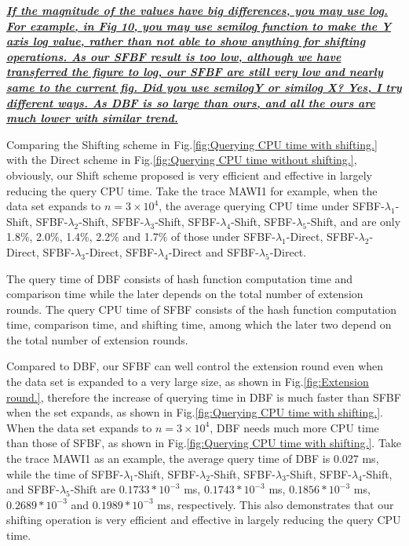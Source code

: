 \documentclass[10pt,journal,letterpaper]{IEEEtran}
\newcommand{\note}[1]{{\sffamily\itshape\bfseries\uline{#1}}}
\begin{document}
\note{If the magnitude of the values have big differences, you may use log. For example, in Fig 10, you may use semilog function to make the Y axis log value, rather than not able to show anything for shifting operations. As our SFBF result is too low, although we have transferred the figure to log, our SFBF are still very low and nearly same to the current fig. Did you use semilogY or similog X? Yes, I try different ways. As DBF is so large than ours, and all the ours are much lower with similar trend. }

 Comparing the Shifting scheme in Fig.\ref{fig:Querying CPU time with shifting.}  with the Direct scheme in Fig.\ref{fig:Querying CPU time without shifting.}, obviously, our Shift scheme proposed is very efficient and effective in largely reducing the query CPU time. Take the trace MAWI1 for example, when the data set expands to $n = 3 \times 10^4$, the average querying CPU time under SFBF-$\lambda_1$-Shift, SFBF-$\lambda_2$-Shift, SFBF-$\lambda_3$-Shift, SFBF-$\lambda_4$-Shift, SFBF-$\lambda_5$-Shift, and are only 1.8\%, 2.0\%, 1.4\%, 2.2\% and 1.7\% of those under SFBF-$\lambda_1$-Direct, SFBF-$\lambda_2$-Direct, SFBF-$\lambda_3$-Direct, SFBF-$\lambda_4$-Direct and SFBF-$\lambda_5$-Direct.

The query time of DBF consists of hash function computation time and comparison time while the later depends on the total number of extension rounds. The query CPU time of SFBF consists of the hash function computation time, comparison time, and shifting time, among which the later two depend on the total number of extension rounds.

 Compared to DBF, our SFBF can well control the extension round even when the data set is expanded to a very large size, as shown in Fig.\ref{fig:Extension round.}, therefore the increase of querying time in DBF is much faster than SFBF when the set expands, as shown in Fig.\ref{fig:Querying CPU time with shifting.}. When the data set expands to $n = 3 \times 10^4$, DBF needs much more CPU time than those of SFBF, as shown in Fig.\ref{fig:Querying CPU time with shifting.}. Take the trace MAWI1 as an example, the average query time of DBF is 0.027 ms, while the time of SFBF-$\lambda_1$-Shift, SFBF-$\lambda_2$-Shift, SFBF-$\lambda_3$-Shift, SFBF-$\lambda_4$-Shift, and SFBF-$\lambda_5$-Shift are $0.1733*10^{-3}$ ms, $0.1743*10^{-3}$ ms, $0.1856*10^{-3}$ ms, $0.2689*10^{-3}$ and $0.1989*10^{-3}$ ms, respectively. This also   demonstrates that our shifting operation is  very
efficient and effective in largely reducing the query CPU time.
\end{document}
